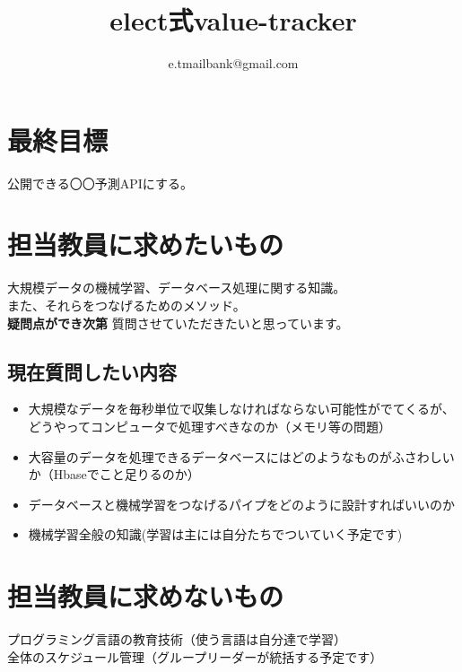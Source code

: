 \documentclass{scrartcl}
\author{e.tmailbank@gmail.com}
\date{}
\title{elect式value-tracker}
\begin{document}
\maketitle
\section{最終目標}
\label{sec:orga84613a}
公開できる〇〇予測APIにする。\\
\section{担当教員に求めたいもの}
\label{sec:org9223b6b}
 大規模データの機械学習、データベース処理に関する知識。\\
また、それらをつなげるためのメソッド。\\
 \textbf{疑問点ができ次第} 質問させていただきたいと思っています。\\
\subsection{現在質問したい内容}
\label{sec:orgdd0c5cb}
\begin{itemize}
\item 大規模なデータを毎秒単位で収集しなければならない可能性がでてくるが、どうやってコンピュータで処理すべきなのか（メモリ等の問題）\\
\item 大容量のデータを処理できるデータベースにはどのようなものがふさわしいか（Hbaseでこと足りるのか）\\
\item データベースと機械学習をつなげるパイプをどのように設計すればいいのか\\
\item 機械学習全般の知識(学習は主には自分たちでついていく予定です)\\
\end{itemize}

\section{担当教員に求めないもの}
\label{sec:org7f3fdfb}
プログラミング言語の教育技術（使う言語は自分達で学習）\\
全体のスケジュール管理（グループリーダーが統括する予定です）\\
\end{document}
